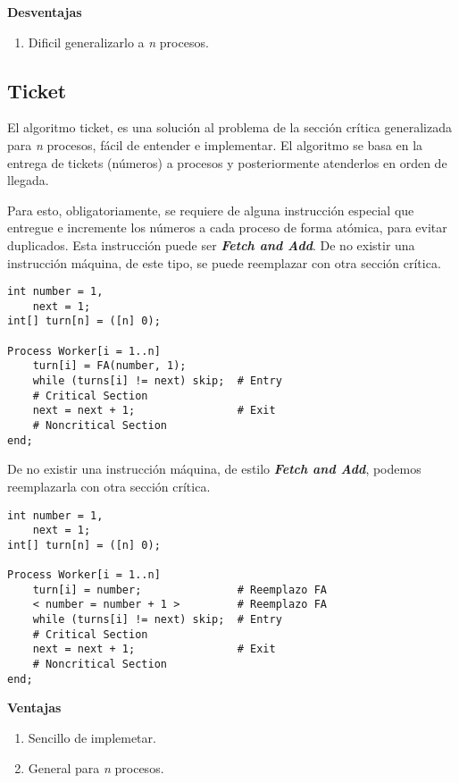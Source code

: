 \documentclass[a4paper, 10pt, margin=0in]{report}
\begin{document}
\textbf{Desventajas}
\begin{enumerate}
    \item Dificil generalizarlo a \emph{n} procesos.
\end{enumerate}

\subsection{Ticket}

El algoritmo ticket, es una solución al problema de la sección crítica generalizada para \emph{n} procesos, fácil de entender e implementar. El algoritmo se basa en la entrega de tickets (números) a procesos y posteriormente atenderlos en orden de llegada.

Para esto, obligatoriamente, se requiere de alguna instrucción especial que entregue e incremente los números a cada proceso de forma atómica, para evitar duplicados. Esta instrucción puede ser \textbf{\emph{Fetch and Add}}. De no existir una instrucción máquina, de este tipo, se puede reemplazar con otra sección crítica.

\begin{lstlisting}
int number = 1,
    next = 1; 
int[] turn[n] = ([n] 0);

Process Worker[i = 1..n]
    turn[i] = FA(number, 1);
    while (turns[i] != next) skip;  # Entry
    # Critical Section
    next = next + 1;                # Exit
    # Noncritical Section
end;
\end{lstlisting}

De no existir una instrucción máquina, de estilo \textbf{\emph{Fetch and Add}}, podemos reemplazarla con otra sección crítica.

\begin{lstlisting}
int number = 1,
    next = 1; 
int[] turn[n] = ([n] 0);

Process Worker[i = 1..n]
    turn[i] = number;               # Reemplazo FA
    < number = number + 1 >         # Reemplazo FA
    while (turns[i] != next) skip;  # Entry
    # Critical Section
    next = next + 1;                # Exit
    # Noncritical Section
end;
\end{lstlisting}

\textbf{Ventajas}
\begin{enumerate}
    \item Sencillo de implemetar.
    \item General para \emph{n} procesos.
\end{enumerate}
\end{document}
